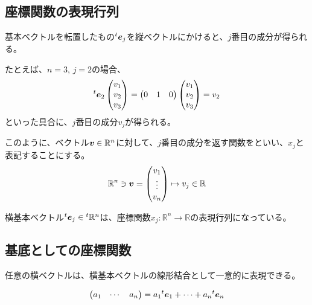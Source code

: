 \documentclass[../../../topic_linear-algebra]{subfiles}
\begin{document}
\subsection{座標関数の表現行列}

基本ベクトルを転置したもの${}^t\vb*{e}_j$を縦ベクトルにかけると、$j$番目の成分が得られる。

たとえば、$n=3,\,j=2$の場合、
\begin{equation*}
  {}^t\vb*{e}_2\begin{pmatrix}
    v_1 \\
    v_2 \\
    v_3
  \end{pmatrix} = \begin{pmatrix}
    0 & 1 & 0
  \end{pmatrix}
  \begin{pmatrix}
    v_1 \\
    v_2 \\
    v_3
  \end{pmatrix}
  = v_2
\end{equation*}
といった具合に、$j$番目の成分$v_j$が得られる。

\br

このように、ベクトル$\vb*{v} \in \mathbb{R}^n$に対して、$j$番目の成分を返す関数をといい、$x_j$と表記することにする。
\begin{equation*}
  \mathbb{R}^n \ni \vb*{v} = \begin{pmatrix}
    v_1 \\
    \vdots \\
    v_n
  \end{pmatrix} \mapsto v_j \in \mathbb{R}
\end{equation*}

横基本ベクトル${}^t\vb*{e}_j \in {}^t\mathbb{R}^n$は、座標関数$x_j\colon \mathbb{R}^n \to \mathbb{R}$の表現行列になっている。

\subsection{基底としての座標関数}

任意の横ベクトルは、横基本ベクトルの線形結合として一意的に表現できる。

\begin{equation*}
  \begin{pmatrix}
    a_1 & \cdots & a_n
  \end{pmatrix}
  = a_1 {}^t\vb*{e}_1 + \cdots + a_n {}^t\vb*{e}_n
\end{equation*}
\end{document}
